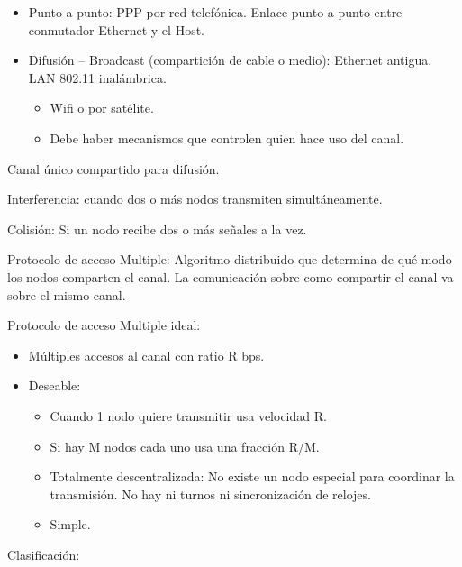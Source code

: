 \documentclass[12pt, twoside, openright]{report} %
\begin{document}
    \begin{itemize}
    \item
      Punto a punto: PPP por red telefónica. Enlace punto a punto entre
      conmutador Ethernet y el Host.
    \item
      Difusión -- Broadcast (compartición de cable o medio): Ethernet
      antigua. LAN 802.11 inalámbrica.

      \begin{itemize}
      \item
        Wifi o por satélite.
      \item
        Debe haber mecanismos que controlen quien hace uso del canal.
      \end{itemize}
    \end{itemize}

    Canal único compartido para difusión.

    Interferencia: cuando dos o más nodos transmiten simultáneamente.

    Colisión: Si un nodo recibe dos o más señales a la vez.

    Protocolo de acceso Multiple: Algoritmo distribuido que determina de
    qué modo los nodos comparten el canal. La comunicación sobre como
    compartir el canal va sobre el mismo canal.

    Protocolo de acceso Multiple ideal:

    \begin{itemize}
    \item
      Múltiples accesos al canal con ratio R bps.
    \item
      Deseable:

      \begin{itemize}
      \item
        Cuando 1 nodo quiere transmitir usa velocidad R.
      \item
        Si hay M nodos cada uno usa una fracción R/M.
      \item
        Totalmente descentralizada: No existe un nodo especial para
        coordinar la transmisión. No hay ni turnos ni sincronización de
        relojes.
      \item
        Simple.
      \end{itemize}
    \end{itemize}

    Clasificación:
\end{document}

